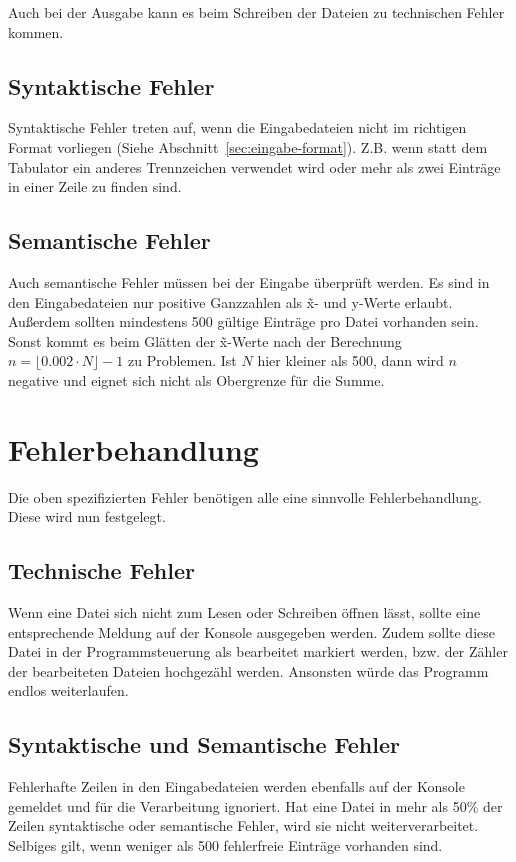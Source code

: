 Auch bei der Ausgabe kann es beim Schreiben der Dateien zu technischen Fehler kommen.

\subsection{Syntaktische Fehler}\label{subsec:syntaktische-fehler}
Syntaktische Fehler treten auf, wenn die Eingabedateien nicht im richtigen Format vorliegen (Siehe Abschnitt~\ref{sec:eingabe-format}).
Z.B. wenn statt dem Tabulator ein anderes Trennzeichen verwendet wird oder mehr als zwei Einträge in einer Zeile zu finden sind.

\subsection{Semantische Fehler}\label{subsec:semantische-fehler}
Auch semantische Fehler müssen bei der Eingabe überprüft werden.
Es sind in den Eingabedateien nur positive Ganzzahlen als \~x- und y-Werte erlaubt.
Außerdem sollten mindestens 500 gültige Einträge pro Datei vorhanden sein.
Sonst kommt es beim Glätten der \~x-Werte nach der Berechnung $n = \lfloor 0.002 \cdot N \rfloor - 1$ zu Problemen.
Ist $N$ hier kleiner als 500, dann wird $n$ negative und eignet sich nicht als Obergrenze für die Summe.

\section{Fehlerbehandlung}\label{sec:fehlerbehandlung}
Die oben spezifizierten Fehler benötigen alle eine sinnvolle Fehlerbehandlung.
Diese wird nun festgelegt.

\subsection{Technische Fehler}\label{subsec:technische-fehler-behandlung}
Wenn eine Datei sich nicht zum Lesen oder Schreiben öffnen lässt, sollte eine entsprechende Meldung auf der Konsole ausgegeben werden.
Zudem sollte diese Datei in der Programmsteuerung als bearbeitet markiert werden, bzw. der Zähler der bearbeiteten Dateien hochgezähl werden.
Ansonsten würde das Programm endlos weiterlaufen.

\subsection{Syntaktische und Semantische Fehler}\label{subsec:syntaktische-semant-fehler-behandlung}
Fehlerhafte Zeilen in den Eingabedateien werden ebenfalls auf der Konsole gemeldet und für die Verarbeitung ignoriert.
Hat eine Datei in mehr als 50\% der Zeilen syntaktische oder semantische Fehler, wird sie nicht weiterverarbeitet.
Selbiges gilt, wenn weniger als 500 fehlerfreie Einträge vorhanden sind.



